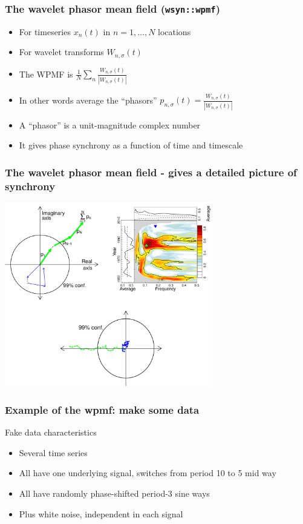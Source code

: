 \documentclass{beamer}
\begin{document}
\begin{frame}
\frametitle{The wavelet phasor mean field (\texttt{wsyn::wpmf})}
  \begin{itemize}
    \item For timeseries $x_n(t)$ in $n=1,\ldots,N$ locations
    \item For wavelet transforms $W_{n,\sigma}(t)$
    \item The WPMF is $\frac{1}{N} \sum_n \frac{W_{n,\sigma}(t)}{|W_{n,\sigma}(t)|}$
    \item In other words average the ``phasors'' $p_{n,\sigma}(t)= \frac{W_{n,\sigma}(t)}{|W_{n,\sigma}(t)|}$
    \item A ``phasor'' is a unit-magnitude complex number
    \item It gives phase synchrony as a function of time and timescale
  \end{itemize}
\end{frame}

\begin{frame}
  \frametitle{The wavelet phasor mean field - gives a detailed picture of synchrony}
  \begin{center}
    \includegraphics[height=8cm]{./figures/WPMF.png}
  \end{center}
\end{frame}

\begin{frame}[fragile]
\frametitle{Example of the wpmf: make some data}
\begin{block}{Fake data characteristics}
\begin{itemize}
\item Several time series
\item All have one underlying signal, switches from period 10 to 5 mid way
\item All have randomly phase-shifted period-3 sine ways
\item Plus white noise, independent in each signal
\end{itemize}
\end{block}
\end{frame}
\end{document}
